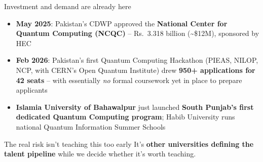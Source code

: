 \documentclass[aspectratio=169,11pt]{beamer}
\begin{document}
\begin{frame}{Investment and demand are already here}
  \small
  \begin{itemize}
    \item \textbf{May 2025}: Pakistan's CDWP approved the \textbf{National
          Center for Quantum Computing (NCQC)} -- Rs.\ 3.318 billion
          (\textasciitilde\$12M), sponsored by HEC
    \item \textbf{Feb 2026}: Pakistan's first Quantum Computing Hackathon
          (PIEAS, NILOP, NCP, with CERN's Open Quantum Institute) drew
          \textbf{950+ applications for 42 seats} -- with essentially
          \emph{no} formal coursework yet in place to prepare applicants
    \item \textbf{Islamia University of Bahawalpur} just launched
          \textbf{South Punjab's first dedicated Quantum Computing
          program}; Habib University runs national Quantum Information
          Summer Schools
  \end{itemize}
  \begin{alertblock}{The real risk isn't teaching this too early}
    It's \textbf{other universities defining the talent pipeline} while
    we decide whether it's worth teaching.
  \end{alertblock}
\end{frame}
\end{document}
